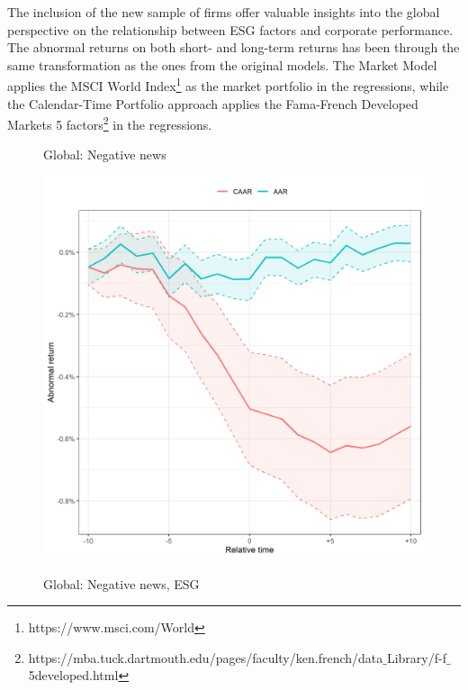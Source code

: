 The inclusion of the new sample of firms offer valuable insights into the global perspective on the relationship between ESG factors and corporate performance. The abnormal returns on both short- and long-term returns has been through the same transformation as the ones from the original models. The Market Model applies the MSCI World Index\footnote{https://www.msci.com/World} as the market portfolio in the regressions, while the Calendar-Time Portfolio approach applies the Fama-French Developed Markets 5 factors\footnote{https://mba.tuck.dartmouth.edu/pages/faculty/ken.french/data$\_$Library/f-f$\_$5developed.html} in the regressions. 

\begin{figure} [H]
     \centering
     \begin{minipage}[b]{0.49\textwidth}
         \centering
    \caption{Global: Negative news}
    \includegraphics[width=\textwidth]{Projekt/1.Figures analysis/ST_negative_all_CI_nasdaq.png}
     \label{fig:ST_neg_sensitivity_nasdaq}
     \end{minipage}
     \hfill
     \begin{minipage}[b]{0.49\textwidth}
       \centering
    \caption{Global: Negative news, ESG}

\end{minipage}
\end{figure}
